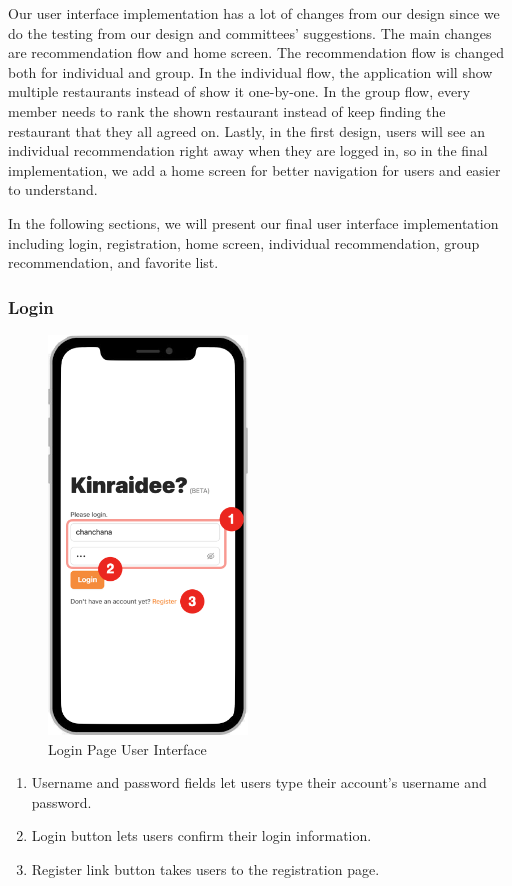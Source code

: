 \documentclass[12pt,oneside,openright,a4paper]{cpe-english-project}
\begin{document}
Our user interface implementation has a lot of changes from our design since we do the testing from our design and committees’ suggestions. The main changes are recommendation flow and home screen. The recommendation flow is changed both for individual and group. In the individual flow, the application will show multiple restaurants instead of show it one-by-one. In the group flow, every member needs to rank the shown restaurant instead of keep finding the restaurant that they all agreed on. Lastly, in the first design, users will see an individual recommendation right away when they are logged in, so in the final implementation, we add a home screen for better navigation for users and easier to understand.

In the following sections, we will present our final user interface implementation including login, registration, home screen, individual recommendation, group recommendation, and favorite list.


\newpage
\subsubsection{Login}
\begin{figure}[H]\centering
\includegraphics[height=300pt]{./images/4ui_LoginPageUserInterface.png}
\caption{Login Page User Interface}\label{fig:4ui_LoginPageUserInterface}
\end{figure}

\begin{enumerate}
\item Username and password fields let users type their account’s username and password.
\item Login button lets users confirm their login information.
\item Register link button takes users to the registration page.
\end{enumerate}
\end{document}
